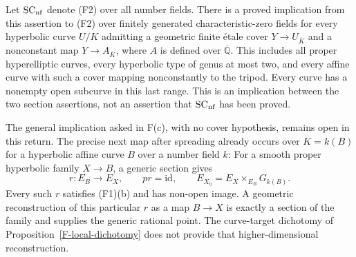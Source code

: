\begin{proposition}
\label{F-field-reduction}
Let $\mathrm{SC}_{\rm nf}$ denote (F2) over all number fields.
There is a proved implication from this assertion to (F2)
over finitely generated characteristic-zero fields for every
hyperbolic curve $U/K$ admitting a geometric finite \'etale
cover $Y\to U_{\overline K}$ and a nonconstant map
$Y\to A_{\overline K}$, where $A$ is defined over
$\overline{\mathbb Q}$. This includes all proper hyperelliptic
curves, every hyperbolic type of genus at most two, and every
affine curve with such a cover mapping nonconstantly to the
tripod. Every curve has a nonempty open subcurve in this last
range. This is an implication between the two section
assertions, not an assertion that $\mathrm{SC}_{\rm nf}$ has
been proved.

The general implication asked in F(c), with no cover
hypothesis, remains open in this return. The precise next
map after spreading already occurs over $K=k(B)$ for a
hyperbolic affine curve $B$ over a number field $k$:
For a smooth proper hyperbolic family
$X\to B$, a generic section gives
\[
 r:E_B\longrightarrow E_X,
 \qquad p r=\mathrm{id},
 \qquad E_{X_\eta}=E_X\times_{E_B}G_{k(B)}.
\]
Every such $r$ satisfies (F1)(b) and has non-open image. A
geometric reconstruction of this particular $r$ as a map
$B\to X$ is exactly a section of the family and supplies the
generic rational point. The curve-target dichotomy of
Proposition~\ref{F-local-dichotomy} does not provide that
higher-dimensional reconstruction.
\end{proposition}
